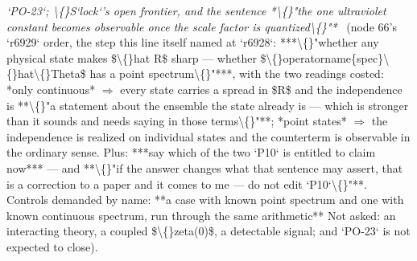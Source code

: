 \begin{description}
\textit{`PO-23`; \textbackslash\{\}S`lock`'s open frontier, and the sentence *\textbackslash\{\}"the one ultraviolet constant becomes observable once the scale factor is quantized\textbackslash\{\}"*} \ (node 66's `r6929` order, the step this line itself named at `r6928`: ***\textbackslash\{\}"whether any physical state makes \$\textbackslash\{\}hat R\$ sharp --- whether \$\textbackslash\{\}operatorname\{spec\}\textbackslash\{\}hat\textbackslash\{\}Theta\$ has a point spectrum\textbackslash\{\}"***, with the two readings costed: *only continuous* \ensuremath{\Rightarrow} every state carries a spread in \$R\$ and the independence is **\textbackslash\{\}"a statement about the ensemble the state already is --- which is stronger than it sounds and needs saying in those terms\textbackslash\{\}"**; *point states* \ensuremath{\Rightarrow} the independence is realized on individual states and the counterterm is observable in the ordinary sense.   Plus: ***say which of the two `P10` is entitled to claim now*** --- and **\textbackslash\{\}"if the answer changes what that sentence may assert, that is a correction to a paper and it comes to me --- do not edit `P10`\textbackslash\{\}"**.   Controls demanded by name: **a case with known point spectrum and one with known continuous spectrum, run through the same arithmetic**  Not asked: an interacting theory, a coupled \$\textbackslash\{\}zeta(0)\$, a detectable signal; and `PO-23` is not expected to close). 

\end{description}

